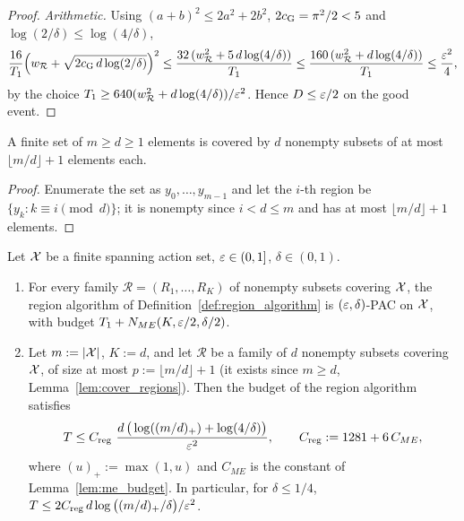 \begin{proof}
\emph{Arithmetic.} Using $(a+b)^2 \le 2a^2 + 2b^2$, $2c_{\mathrm{G}} = \pi^2/2 < 5$ and
$\log(2/\delta) \le \log(4/\delta)$,
\[
  \frac{16}{T_1}\Big(w_{\mathcal R} + \sqrt{2c_{\mathrm{G}}\,d\log(2/\delta)}\Big)^2
  \le \frac{32\,(w_{\mathcal R}^2 + 5\,d\log(4/\delta))}{T_1}
  \le \frac{160\,(w_{\mathcal R}^2 + d\log(4/\delta))}{T_1} \le \frac{\varepsilon^2}{4},
\]
by the choice $T_1 \ge 640(w_{\mathcal R}^2 + d\log(4/\delta))/\varepsilon^2$. Hence $D \le \varepsilon/2$
on the good event.
\end{proof}

\begin{lemma}\label{lem:cover_regions}
\leanok
A finite set of $m \ge d \ge 1$ elements is covered by $d$ nonempty subsets of at most
$\lfloor m/d\rfloor + 1$ elements each.
\end{lemma}

\begin{proof}
\leanok
Enumerate the set as $y_0, \dots, y_{m-1}$ and let the $i$-th region be
$\{y_k : k \equiv i \pmod d\}$; it is nonempty since $i < d \le m$ and has at most
$\lfloor m/d\rfloor + 1$ elements.
\end{proof}

\begin{theorem}\label{thm:log_gains}
\leanok
{}
Let $\mathcal{X}$ be a finite spanning action set, $\varepsilon\in(0,1]$, $\delta\in(0,1)$.
\begin{enumerate}
  \item[(i)] For every family $\mathcal R = (R_1,\dots,R_K)$ of nonempty subsets covering
        $\mathcal{X}$, the region
        algorithm of Definition~\ref{def:region_algorithm} is $(\varepsilon,\delta)$-PAC on $\mathcal{X}$,
        with budget $T_1 + N_{ME}(K,\varepsilon/2,\delta/2)$.
  \item[(ii)] Let $m := \lvert \mathcal{X} \rvert$, $K := d$, and let $\mathcal R$ be a family of
        $d$ nonempty subsets covering $\mathcal{X}$, of size at most $p := \lfloor m/d\rfloor + 1$
        (it exists since $m \ge d$, Lemma~\ref{lem:cover_regions}).
        Then the budget of the region algorithm satisfies
        \[
          T \le C_{\mathrm{reg}}\ \frac{d\,\big(\log((m/d)_+) + \log(4/\delta)\big)}{\varepsilon^2},
          \qquad C_{\mathrm{reg}} := 1281 + 6\,C_{ME},
        \]
        where $(u)_+ := \max(1,u)$ and $C_{ME}$ is the constant of Lemma~\ref{lem:me_budget}.
        In particular, for $\delta \le 1/4$,
        $T \le 2C_{\mathrm{reg}}\, d\log\big((m/d)_+/\delta\big)/\varepsilon^2$.
\end{enumerate}
\end{theorem}

